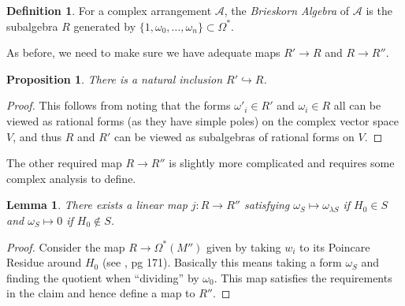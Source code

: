 \documentclass[article,twoside]{article}
\newcommand{\script}[1]{\mathcal{#1}}
\theoremstyle{plain}
\theoremstyle{plain}
\newtheorem{lemma}[lemma]{Lemma}
\theoremstyle{plain}
\newtheorem{proposition}[proposition]{Proposition}
\theoremstyle{plain}
\theoremstyle{plain}
\theoremstyle{definition}
\newtheorem{definition}[definition]{Definition}
\theoremstyle{definition}
\theoremstyle{definition}
\theoremstyle{remark}
\theoremstyle{remark}
\begin{document}
\begin{definition}
	For a complex arrangement $\script{A}$, the \emph{Brieskorn Algebra} of $\script{A}$ is the subalgebra $R$ generated by $\{1,\omega_0,\dots,\omega_n\}\subset\Omega^*$.
\end{definition}

As before, we need to make sure we have adequate maps $R'\to R$ and $R\to R''$.




\begin{proposition}\label{brieskorn_injection}
	There is a natural inclusion $R'\hookrightarrow R$.
\end{proposition}
\begin{proof}
	This follows from noting that the forms $\omega'_i\in R'$ and $\omega_i\in R$ all can be viewed as rational forms (as they have simple poles) on the complex vector space $V$, and thus $R$ and $R'$ can be viewed as subalgebras of rational forms on $V$.
\end{proof}




The other required map $R\to R''$ is slightly more complicated and requires some complex analysis to define.


\begin{lemma}\label{brieskorn_surjection}
	There exists a linear map $j:R\to R''$ satisfying $\omega_S\mapsto\omega_{\lambda S}$ if $H_0\in S$ and $\omega_S\mapsto 0$ if $H_0\notin S$.
\end{lemma}
\begin{proof}
	Consider the map $R\to\Omega^*(M'')$ given by taking $w_i$ to its Poincare Residue around $H_0$ (see \cite{khesin_wendt}, pg 171). Basically this means taking a form $\omega_S$ and finding the quotient when ``dividing'' by $\omega_0$. This map satisfies the requirements in the claim and hence define a map to $R''$.
\end{proof}



\end{document}
